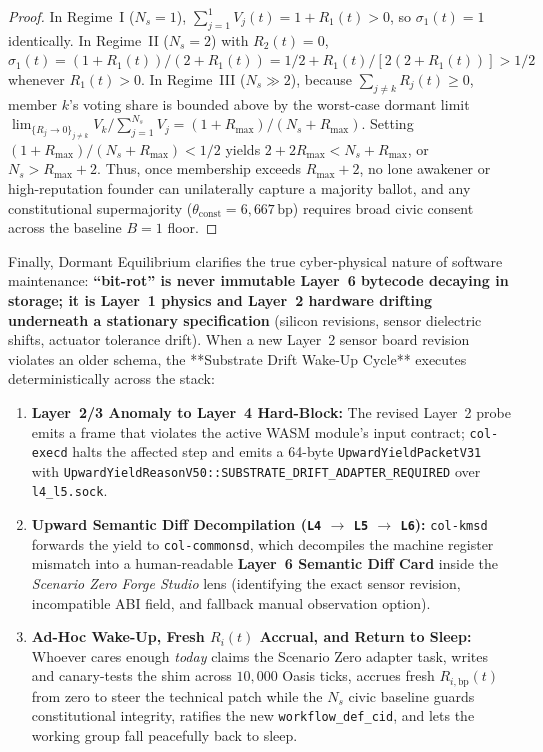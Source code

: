 \begin{proof}
In Regime~I ($N_s = 1$), $\sum_{j=1}^{1} V_j(t) = 1 + R_1(t) > 0$, so $\sigma_1(t) = 1$ identically. In Regime~II
($N_s = 2$) with $R_2(t) = 0$, $\sigma_1(t) = (1 + R_1(t))/(2 + R_1(t)) = 1/2 + R_1(t)/[2(2 + R_1(t))] > 1/2$ whenever
$R_1(t) > 0$. In Regime~III ($N_s \gg 2$), because $\sum_{j \ne k} R_j(t) \ge 0$, member $k$'s voting share is bounded
above by the worst-case dormant limit $\lim_{\{R_j \to 0\}_{j \ne k}} V_k / \sum_{j=1}^{N_s} V_j = (1 + R_{\max}) / (N_s + R_{\max})$.
Setting $(1 + R_{\max}) / (N_s + R_{\max}) < 1/2$ yields $2 + 2R_{\max} < N_s + R_{\max}$, or $N_s > R_{\max} + 2$.
Thus, once membership exceeds $R_{\max} + 2$, no lone awakener or high-reputation founder can unilaterally capture a
majority ballot, and any constitutional supermajority ($\theta_{\mathrm{const}} = 6{,}667\,\mathrm{bp}$) requires
broad civic consent across the baseline $B=1$ floor.
\end{proof}

Finally, Dormant Equilibrium clarifies the true cyber-physical nature of software maintenance: \textbf{``bit-rot'' is
never immutable Layer~6 bytecode decaying in storage; it is Layer~1 physics and Layer~2 hardware drifting underneath a
stationary specification} (silicon revisions, sensor dielectric shifts, actuator tolerance drift). When a new Layer~2
sensor board revision violates an older schema, the **Substrate Drift Wake-Up Cycle** executes deterministically across
the stack:
\begin{enumerate}
    \item \textbf{Layer~2/3 Anomaly to Layer~4 Hard-Block:} The revised Layer~2 probe emits a frame that violates the
    active WASM module's input contract; \texttt{col-execd} halts the affected step and emits a 64-byte
    \texttt{UpwardYieldPacketV31} with \texttt{UpwardYieldReasonV50::SUBSTRATE\_DRIFT\_ADAPTER\_REQUIRED} over
    \texttt{l4\_l5.sock}.
    \item \textbf{Upward Semantic Diff Decompilation (\texttt{L4} $\to$ \texttt{L5} $\to$ \texttt{L6}):}
    \texttt{col-kmsd} forwards the yield to \texttt{col-commonsd}, which decompiles the machine register mismatch into
    a human-readable \textbf{Layer~6 Semantic Diff Card} inside the \emph{Scenario Zero Forge Studio} lens (identifying
    the exact sensor revision, incompatible ABI field, and fallback manual observation option).
    \item \textbf{Ad-Hoc Wake-Up, Fresh $R_i(t)$ Accrual, and Return to Sleep:} Whoever cares enough \emph{today} claims
    the Scenario Zero adapter task, writes and canary-tests the shim across $10{,}000$ Oasis ticks, accrues fresh
    $R_{i,\mathrm{bp}}(t)$ from zero to steer the technical patch while the $N_s$ civic baseline guards constitutional
    integrity, ratifies the new \texttt{workflow\_def\_cid}, and lets the working group fall peacefully back to sleep.
\end{enumerate}

